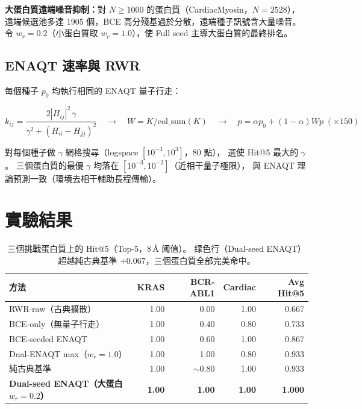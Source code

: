 \documentclass[11pt, a4paper]{article}
\begin{document}
\textbf{大蛋白質遠端噪音抑制：}對 $N \geq 1000$ 的蛋白質（CardiacMyosin，$N=2528$），
遠端候選池多達 1905 個，BCE 高分殘基過於分散，遠端種子訊號含大量噪音。
令 $w_r = 0.2$（小蛋白質取 $w_r = 1.0$），使 Full seed 主導大蛋白質的最終排名。

\subsection{ENAQT 速率與 RWR}

每個種子 $p_0$ 均執行相同的 ENAQT 量子行走：

\[
  k_{ij} = \frac{2|H_{ij}|^2\,\gamma}{\gamma^2 + (H_{ii}-H_{jj})^2}
  \quad\longrightarrow\quad
  W = K/\text{col\_sum}(K)
  \quad\longrightarrow\quad
  p = \alpha p_0 + (1-\alpha) W p \;(\times 150)
\]

對每個種子做 $\gamma$ 網格搜尋（logspace $[10^{-3}, 10^3]$，80 點），
選使 Hit@5 最大的 $\gamma$。
三個蛋白質的最優 $\gamma$ 均落在 $[10^{-3}, 10^{-2}]$（近相干量子極限），
與 ENAQT 理論預測一致（環境去相干輔助長程傳輸）。

\section{實驗結果}

\begin{table}[H]
\centering
\setlength{\tabcolsep}{8pt}
\begin{tabular}{lrrrr}
\toprule
\textbf{方法} & \textbf{KRAS} & \textbf{BCR-ABL1} & \textbf{Cardiac} & \textbf{Avg Hit@5} \\
\midrule
RWR-raw（古典擴散） & 1.00 & 0.00 & 1.00 & 0.667 \\
BCE-only（無量子行走） & 1.00 & 0.40 & 0.80 & 0.733 \\
BCE-seeded ENAQT & 1.00 & 0.60 & 1.00 & 0.867 \\
Dual-ENAQT max（$w_r=1.0$）& 1.00 & 1.00 & 0.80 & 0.933 \\
純古典基準 & 1.00 & $\sim$0.80 & 1.00 & 0.933 \\
\rowcolor{green!20}
\textbf{Dual-seed ENAQT（大蛋白 $w_r=0.2$）} & \textbf{1.00} & \textbf{1.00} & \textbf{1.00} & \textbf{1.000} \\
\bottomrule
\end{tabular}
\caption{三個挑戰蛋白質上的 Hit@5（Top-5，8\,\AA{} 阈值）。
  绿色行（Dual-seed ENAQT）超越純古典基準 $+0.067$，三個蛋白質全部完美命中。}
\end{table}
\end{document}
